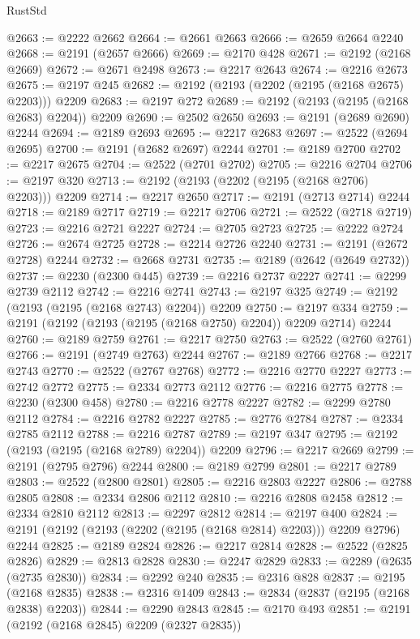 \begin{lexlean}{RustStd}
\begin{coremodule}
@2663 := @2222 @2662
@2664 := @2661 @2663
@2666 := @2659 @2664 @2240
@2668 := @2191 (@2657 @2666)
@2669 := @2170 @428
@2671 := @2192 (@2168 @2669)
@2672 := @2671 @2498
@2673 := @2217 @2643
@2674 := @2216 @2673
@2675 := @2197 @245
@2682 := @2192 (@2193 (@2202 (@2195 (@2168 @2675) @2203))) @2209
@2683 := @2197 @272
@2689 := @2192 (@2193 (@2195 (@2168 @2683) @2204)) @2209
@2690 := @2502 @2650
@2693 := @2191 (@2689 @2690) @2244
@2694 := @2189 @2693
@2695 := @2217 @2683
@2697 := @2522 (@2694 @2695)
@2700 := @2191 (@2682 @2697) @2244
@2701 := @2189 @2700
@2702 := @2217 @2675
@2704 := @2522 (@2701 @2702)
@2705 := @2216 @2704
@2706 := @2197 @320
@2713 := @2192 (@2193 (@2202 (@2195 (@2168 @2706) @2203))) @2209
@2714 := @2217 @2650
@2717 := @2191 (@2713 @2714) @2244
@2718 := @2189 @2717
@2719 := @2217 @2706
@2721 := @2522 (@2718 @2719)
@2723 := @2216 @2721 @2227
@2724 := @2705 @2723
@2725 := @2222 @2724
@2726 := @2674 @2725
@2728 := @2214 @2726 @2240
@2731 := @2191 (@2672 @2728) @2244
@2732 := @2668 @2731
@2735 := @2189 (@2642 (@2649 @2732))
@2737 := @2230 (@2300 @445)
@2739 := @2216 @2737 @2227
@2741 := @2299 @2739 @2112
@2742 := @2216 @2741
@2743 := @2197 @325
@2749 := @2192 (@2193 (@2195 (@2168 @2743) @2204)) @2209
@2750 := @2197 @334
@2759 := @2191 (@2192 (@2193 (@2195 (@2168 @2750) @2204)) @2209 @2714) @2244
@2760 := @2189 @2759
@2761 := @2217 @2750
@2763 := @2522 (@2760 @2761)
@2766 := @2191 (@2749 @2763) @2244
@2767 := @2189 @2766
@2768 := @2217 @2743
@2770 := @2522 (@2767 @2768)
@2772 := @2216 @2770 @2227
@2773 := @2742 @2772
@2775 := @2334 @2773 @2112
@2776 := @2216 @2775
@2778 := @2230 (@2300 @458)
@2780 := @2216 @2778 @2227
@2782 := @2299 @2780 @2112
@2784 := @2216 @2782 @2227
@2785 := @2776 @2784
@2787 := @2334 @2785 @2112
@2788 := @2216 @2787
@2789 := @2197 @347
@2795 := @2192 (@2193 (@2195 (@2168 @2789) @2204)) @2209
@2796 := @2217 @2669
@2799 := @2191 (@2795 @2796) @2244
@2800 := @2189 @2799
@2801 := @2217 @2789
@2803 := @2522 (@2800 @2801)
@2805 := @2216 @2803 @2227
@2806 := @2788 @2805
@2808 := @2334 @2806 @2112
@2810 := @2216 @2808 @2458
@2812 := @2334 @2810 @2112
@2813 := @2297 @2812
@2814 := @2197 @400
@2824 := @2191 (@2192 (@2193 (@2202 (@2195 (@2168 @2814) @2203))) @2209 @2796) @2244
@2825 := @2189 @2824
@2826 := @2217 @2814
@2828 := @2522 (@2825 @2826)
@2829 := @2813 @2828
@2830 := @2247 @2829
@2833 := @2289 (@2635 (@2735 @2830))
@2834 := @2292 @240
@2835 := @2316 @828
@2837 := @2195 (@2168 @2835)
@2838 := @2316 @1409
@2843 := @2834 (@2837 (@2195 (@2168 @2838) @2203))
@2844 := @2290 @2843
@2845 := @2170 @493
@2851 := @2191 (@2192 (@2168 @2845) @2209 (@2327 @2835))

\end{coremodule}
\end{lexlean}

